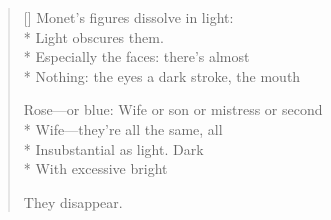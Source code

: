 \label{ch:print_over_the_sink_york}
\settowidth{\versewidth}{Rose---or blue: Wife or son or mistress or second}
\begin{verse}[\versewidth]
Monet's figures dissolve in light:\\*
Light obscures them.\\*
Especially the faces: there's almost\\*
Nothing: the eyes a dark stroke, the mouth

Rose---or blue: Wife or son or mistress or second\\*
Wife---they're all the same, all\\*
Insubstantial as light.  Dark \\*
With excessive bright

They disappear.
\end{verse}
